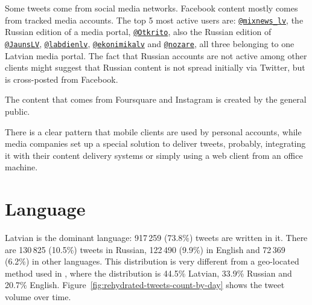 \documentclass{IOS-Book-Article}
\makeatletter
\newcommand{\hl}[1]{#1}
\newcommand{\sn}[1]{\href{https://twitter.com/#1}{\texttt{@#1}}}
\makeatother
\begin{document}


Some tweets come from social media networks. Facebook content mostly comes from tracked media accounts. The top 5 most active users are: \sn{mixnews\_lv}, the Russian edition of a media portal, \sn{Otkrito}, also the Russian edition of \sn{JaunsLV}, \sn{labdienlv}, \sn{ekonimikalv} and \sn{nozare}, all three belonging to one Latvian media portal. The fact that Russian accounts are not active among other clients might suggest that Russian content is not spread initially via Twitter, but is cross-posted from Facebook.

The content that comes from Foursquare and Instagram is created by the general public.

There is a clear pattern that mobile clients are used by personal accounts, while media companies set up a special solution to deliver tweets, probably, integrating it with their content delivery systems or simply using a web client from an office machine.


\section{Language}
\label{sec:language}



Latvian is the dominant language: \hl{917\,259 (73.8\%)} tweets are written in it.\footnotemark{} There are \hl{130\,825 (10.5\%)} tweets in Russian, \hl{122\,490 (9.9\%)} in English and \hl{72\,369\, (6.2\%)} in other languages. This distribution is very different from a geo-located method used in \cite{milajevs:2017:BUCC}, where the distribution is 44.5\% Latvian, 33.9\% Russian and 20.7\% English. Figure~\ref{fig:rehydrated-tweets-count-by-day} shows the tweet volume over time.
\end{document}

